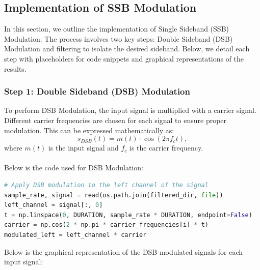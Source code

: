 \documentclass[12pt,a4paper]{article}
\begin{document}
\subsection{Implementation of SSB Modulation}

In this section, we outline the implementation of Single Sideband (SSB) Modulation. The process involves two key steps: Double Sideband (DSB) Modulation and filtering to isolate the desired sideband. Below, we detail each step with placeholders for code snippets and graphical representations of the results.

\subsubsection{Step 1: Double Sideband (DSB) Modulation}
To perform DSB Modulation, the input signal is multiplied with a carrier signal. Different carrier frequencies are chosen for each signal to ensure proper modulation. This can be expressed mathematically as:
\[ s_{DSB}(t) = m(t) \cdot \cos(2\pi f_c t), \]
where \( m(t) \) is the input signal and \( f_c \) is the carrier frequency. \\
\\
Below is the code used for DSB Modulation:
\begin{lstlisting}[language=Python, caption=DSB Modulation Code]
# Apply DSB modulation to the left channel of the signal
sample_rate, signal = read(os.path.join(filtered_dir, file))
left_channel = signal[:, 0]
t = np.linspace(0, DURATION, sample_rate * DURATION, endpoint=False)
carrier = np.cos(2 * np.pi * carrier_frequencies[i] * t)
modulated_left = left_channel * carrier
\end{lstlisting}
Below is the graphical representation of the DSB-modulated signals for each input signal:
\end{document}
